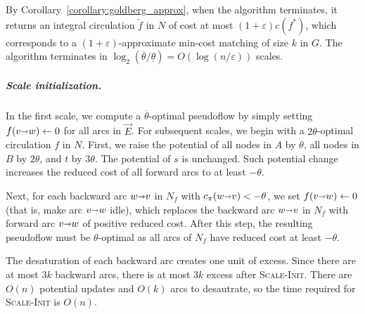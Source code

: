 \documentclass[a4paper,UKenglish]{socg-lipics-v2019}
\def\eps{\varepsilon}
\def\arcto{\mathord\shortrightarrow}
\def\arc#1#2{#1\arcto#2}
\def\cost{c}
\theoremstyle{plain}
\numberwithin{figure}{section}
\renewcommand{\paragraph}{\subparagraph}
\begin{document}
By Corollary~\ref{corollary:goldberg_approx}, when the algorithm terminates,
it returns an integral circulation $\tilde{f}$ in $N$ of cost at most
$(1+\eps) \cost(f^*)$, which corresponds to a $(1+\eps)$-approximate min-cost
matching of size $k$ in $G$.
The algorithm terminates in
$\log_2(\overline{\theta}/\underline{\theta}) = O(\log(n/\eps))$ scales.


\paragraph{Scale initialization.}
In the first scale, we compute a $\overline{\theta}$-optimal pseudoflow by
simply setting $f(\arc vw) \gets 0$ for all arcs in $\vec{E}$.
For subsequent scales, we begin with a $2\theta$-optimal circulation $f$ in $N$.
First, we raise the potential of all nodes in $A$ by $\theta$, all nodes in $B$ by $2\theta$,
and $t$ by $3\theta$.
The potential of $s$ is unchanged.
%
Such potential change increases the reduced cost of all forward arcs to at least
$-\theta$.

Next, for each backward arc $\arc wv$ in $N_f$ with $c_\pi(\arc wv) < -\theta$,
we set $f(\arc vw) \gets 0$ (that is, make arc $\arc vw$ idle), which replaces the
backward arc $\arc wv$ in $N_f$ with forward arc $\arc vw$ of positive reduced cost.
After this step, the resulting pseudoflow must be $\theta$-optimal as all arcs
of $N_f$ have reduced cost at least $-\theta$.

The desaturation of each backward arc creates one unit of excess.
Since there are at most $3k$ backward arcs, there is at most $3k$ excess after
\textsc{Scale-Init}.
There are $O(n)$ potential updates and $O(k)$ arcs to desautrate,
so the time required for \textsc{Scale-Init} is $O(n)$.
\end{document}
